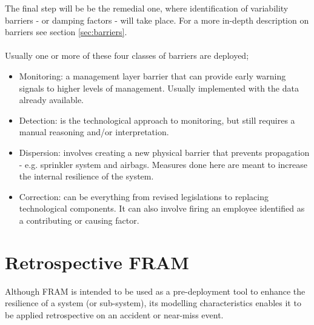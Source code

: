 The final step will be be the remedial one, where identification of variability barriers - or damping factors - will take place. For a more in-depth description on barriers see section \ref{sec:barriers}.\\
\\
Usually one or more of these four classes of barriers are deployed;
\begin{itemize}
  \item Monitoring: a management layer barrier that can provide early warning signals to higher levels of management. Usually implemented with the data already available.
  \item Detection: is the technological approach to monitoring, but still requires a manual reasoning and/or interpretation.
  \item Dispersion: involves creating a new physical barrier that prevents propagation - e.g. sprinkler system and airbags. Measures done here are meant to increase the internal resilience of the system.
  \item Correction: can be everything from revised legislations to replacing technological components. It can also involve firing an employee identified as a contributing or causing factor.
\end{itemize}

\section{Retrospective FRAM}
Although FRAM is intended to be used as a pre-deployment tool to enhance the resilience of a system (or sub-system), its modelling characteristics enables it to be applied retrospective on an accident or near-miss event.\\
\\


